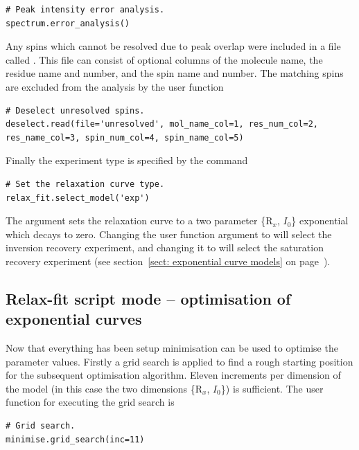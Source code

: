 \begin{lstlisting}[firstnumber=53]
# Peak intensity error analysis.
spectrum.error_analysis()
\end{lstlisting}

Any spins which cannot be resolved due to peak overlap were included in a file called .
This file can consist of optional columns of the molecule name, the residue name and number, and the spin name and number.
The matching spins are excluded from the analysis by the user function

\begin{lstlisting}[firstnumber=56]
# Deselect unresolved spins.
deselect.read(file='unresolved', mol_name_col=1, res_num_col=2, res_name_col=3, spin_num_col=4, spin_name_col=5)
\end{lstlisting}

Finally the experiment type is specified by the command

\begin{lstlisting}[firstnumber=59]
# Set the relaxation curve type.
relax_fit.select_model('exp')
\end{lstlisting}

The argument  sets the relaxation curve to a two parameter \{$\mathrm{R}_x$, $I_0$\} exponential which decays to zero.
Changing the user function argument to  will select the inversion recovery experiment, and changing it to  will select the saturation recovery experiment (see section~\ref{sect: exponential curve models} on page~\pageref{sect: exponential curve models}).




\subsection{Relax-fit script mode -- optimisation of exponential curves}

Now that everything has been setup minimisation can be used to optimise the parameter values.
Firstly a grid search is applied to find a rough starting position for the subsequent optimisation algorithm.
Eleven increments per dimension of the model (in this case the two dimensions \{$\mathrm{R}_x$, $I_0$\}) is sufficient.
The user function for executing the grid search is

\begin{lstlisting}[firstnumber=62]
# Grid search.
minimise.grid_search(inc=11)
\end{lstlisting}

